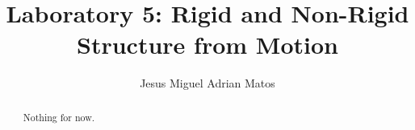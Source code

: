 \documentclass[]{article}
\title{Laboratory 5: Rigid and Non-Rigid Structure from Motion}
\author{Jesus Miguel Adrian Matos}
\begin{document}
\maketitle

\begin{abstract}
	Nothing for now.
\end{abstract}
 





\end{document}
